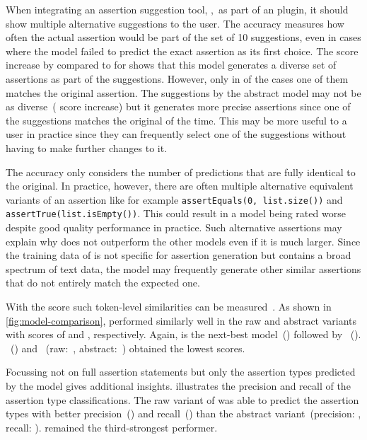 When integrating an assertion suggestion tool, \eg,~as part of an \ide
plugin, it should show multiple alternative suggestions to the user.
The  accuracy measures how often the actual assertion would
be part of the set of 10 suggestions, even in cases where the model
failed to predict the exact assertion as its first choice.
The score increase by  compared to  for \togaast
shows that this model generates a diverse set of assertions as part of
the  suggestions. However, only in  of the cases one
of them matches the original assertion.
The suggestions by the abstract \assertfive model may not be as
diverse~( score increase) but it generates more precise
assertions since one of the suggestions matches the original
 of the time.
This may be more useful to a user in practice since they can
frequently select one of the suggestions without having to make
further changes to it.

The accuracy only considers the number of predictions that are fully
identical to the original. In practice, however, there are often
multiple alternative equivalent variants of an assertion like for
example \verb|assertEquals(0, list.size())| and
\verb|assertTrue(list.isEmpty())|. This could result in a model being
rated worse despite good quality performance in practice.
Such alternative assertions may explain why \chatgpt does not
outperform the other models even if it is much larger. Since the
training data of \chatgpt is not specific for assertion generation but
contains a broad spectrum of text data, the model may frequently
generate other similar assertions that do not entirely match the
expected one.

With the \bleu score such token-level similarities can be
measured~\cite{Papineni2002}.
As shown in \cref{fig:model-comparison}, \assertfive performed
similarly well in the raw and abstract variants with \bleu scores of
 and , respectively.
Again, \togaast is the next-best model~() followed by
\chatgpt~().
\doprebart~() and \atlas~(raw:~,
abstract:~) obtained the lowest scores.

Focussing not on full assertion statements but only the assertion
types predicted by the model gives additional insights.
 illustrates the precision and recall of
the assertion type classifications. The raw variant of \assertfive was
able to predict the assertion types with better
precision~() and recall~() than the abstract
variant~(precision: , recall: ).
\togaast remained the third-strongest performer.

